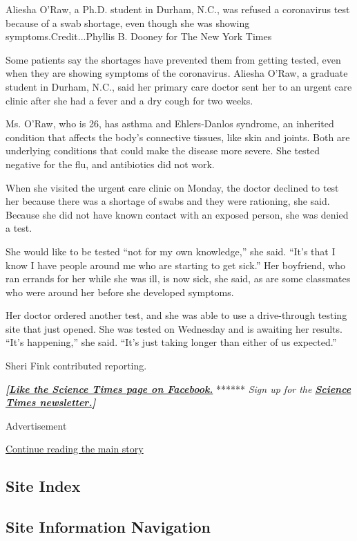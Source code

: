 Aliesha O'Raw, a Ph.D. student in Durham, N.C., was refused a
coronavirus test because of a swab shortage, even though she was showing
symptoms.Credit...Phyllis B. Dooney for The New York Times

Some patients say the shortages have prevented them from getting tested,
even when they are showing symptoms of the coronavirus. Aliesha O'Raw, a
graduate student in Durham, N.C., said her primary care doctor sent her
to an urgent care clinic after she had a fever and a dry cough for two
weeks.

Ms. O'Raw, who is 26, has asthma and Ehlers-Danlos syndrome, an
inherited condition that affects the body's connective tissues, like
skin and joints. Both are underlying conditions that could make the
disease more severe. She tested negative for the flu, and antibiotics
did not work.

When she visited the urgent care clinic on Monday, the doctor declined
to test her because there was a shortage of swabs and they were
rationing, she said. Because she did not have known contact with an
exposed person, she was denied a test.

She would like to be tested ``not for my own knowledge,'' she said.
``It's that I know I have people around me who are starting to get
sick.'' Her boyfriend, who ran errands for her while she was ill, is now
sick, she said, as are some classmates who were around her before she
developed symptoms.

Her doctor ordered another test, and she was able to use a drive-through
testing site that just opened. She was tested on Wednesday and is
awaiting her results. ``It's happening,'' she said. ``It's just taking
longer than either of us expected.''

Sheri Fink contributed reporting.

\textbf{\emph{{[}}\href{http://on.fb.me/1paTQ1h}{\emph{Like the Science
Times page on Facebook.}}} ****** \emph{\textbar{} Sign up for the}
\textbf{\href{http://nyti.ms/1MbHaRU}{\emph{Science Times
newsletter.}}\emph{{]}}}

Advertisement

\protect\hyperlink{after-bottom}{Continue reading the main story}

\hypertarget{site-index}{%
\subsection{Site Index}\label{site-index}}

\hypertarget{site-information-navigation}{%
\subsection{Site Information
Navigation}\label{site-information-navigation}}

